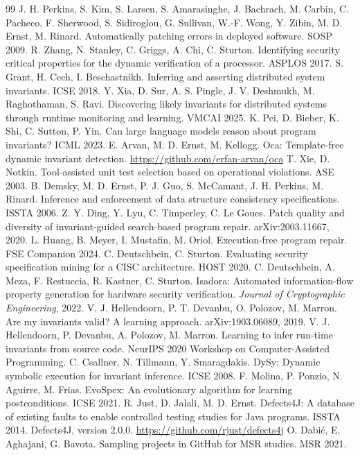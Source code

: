 \documentclass{article}
\begin{document}
\begin{thebibliography}{99}
 J. H. Perkins, S. Kim, S. Larsen, S. Amarasinghe, J. Bachrach, M. Carbin, C. Pacheco, F. Sherwood, S. Sidiroglou, G. Sullivan, W.-F. Wong, Y. Zibin, M. D. Ernst, M. Rinard. Automatically patching errors in deployed software. SOSP 2009.
 R. Zhang, N. Stanley, C. Griggs, A. Chi, C. Sturton. Identifying security critical properties for the dynamic verification of a processor. ASPLOS 2017.
 S. Grant, H. Cech, I. Beschastnikh. Inferring and asserting distributed system invariants. ICSE 2018.
 Y. Xia, D. Sur, A. S. Pingle, J. V. Deshmukh, M. Raghothaman, S. Ravi. Discovering likely invariants for distributed systems through runtime monitoring and learning. VMCAI 2025.
 K. Pei, D. Bieber, K. Shi, C. Sutton, P. Yin. Can large language models reason about program invariants? ICML 2023.
 E. Arvan, M. D. Ernst, M. Kellogg. Oca: Template-free dynamic invariant detection. \url{https://github.com/erfan-arvan/oca}
 T. Xie, D. Notkin. Tool-assisted unit test selection based on operational violations. ASE 2003.
 B. Demsky, M. D. Ernst, P. J. Guo, S. McCamant, J. H. Perkins, M. Rinard. Inference and enforcement of data structure consistency specifications. ISSTA 2006.
 Z. Y. Ding, Y. Lyu, C. Timperley, C. Le Goues. Patch quality and diversity of invariant-guided search-based program repair. arXiv:2003.11667, 2020.
 L. Huang, B. Meyer, I. Mustafin, M. Oriol. Execution-free program repair. FSE Companion 2024.
 C. Deutschbein, C. Sturton. Evaluating security specification mining for a CISC architecture. HOST 2020.
 C. Deutschbein, A. Meza, F. Restuccia, R. Kastner, C. Sturton. Isadora: Automated information-flow property generation for hardware security verification. \emph{Journal of Cryptographic Engineering}, 2022.
 V. J. Hellendoorn, P. T. Devanbu, O. Polozov, M. Marron. Are my invariants valid? A learning approach. arXiv:1903.06089, 2019.
 V. J. Hellendoorn, P. Devanbu, A. Polozov, M. Marron. Learning to infer run-time invariants from source code. NeurIPS 2020 Workshop on Computer-Assisted Programming.
 C. Csallner, N. Tillmann, Y. Smaragdakis. DySy: Dynamic symbolic execution for invariant inference. ICSE 2008.
 F. Molina, P. Ponzio, N. Aguirre, M. Frias. EvoSpex: An evolutionary algorithm for learning postconditions. ICSE 2021.
 R. Just, D. Jalali, M. D. Ernst. Defects4J: A database of existing faults to enable controlled testing studies for Java programs. ISSTA 2014.
 Defects4J, version 2.0.0. \url{https://github.com/rjust/defects4j}
 O. Dabi\'c, E. Aghajani, G. Bavota. Sampling projects in GitHub for MSR studies. MSR 2021.
\end{thebibliography}
\end{document}
